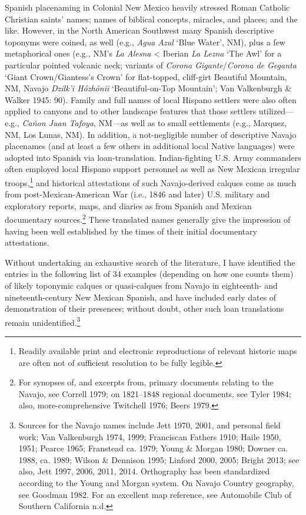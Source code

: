 Spanish placenaming in Colonial New Mexico heavily stressed Roman Catholic Christian saints’ names; names of biblical concepts, miracles, and places; and the like.  However, in the North American Southwest many Spanish descriptive toponyms were coined, as well (e.g., \textit{Agua Azul} ‘Blue Water’, NM), plus a few metaphorical ones (e.g., NM’s \textit{La Alesna} {\textless} Iberian \textit{La Lezna} ‘The Awl’ for a particular pointed volcanic neck; variants of \textit{Corona Gigante}/\textit{Corona de Geganta }‘Giant Crown/Giantess’s Crown’ for flat-topped, cliff-girt Beautiful Mountain, NM, Navajo \textit{Dzilk'i Hózhónii} ‘Beautiful-on-Top Mountain’; Van Valkenburgh \& Walker 1945: 90).  Family and full names of local Hispano settlers were also often applied to canyons and to other landscape features that those settlers utilized—e.g., \textit{Cañon Juan Tafoya}, NM\textit{—}as well as to small settlements (e.g., Marquez, NM, Los Lunas, NM).  In addition, a not-negligible number of descriptive Navajo placenames (and at least a few others in additional local Native languages) were adopted into Spanish via loan-translation.  Indian-fighting U.S. Army commanders often employed local Hispano support personnel as well as New Mexican irregular troops,\footnote{Readily available print and electronic reproductions of relevant historic maps are often not of sufficient resolution to be fully legible.} and historical attestations of such Navajo-derived calques come as much from post-Mexican-American War (i.e., 1846 and later) U.S. military and exploratory reports, maps, and diaries as from Spanish and Mexican documentary sources.\footnote{For synopses of, and excerpts from, primary documents relating to the Navajo, see Correll 1979; on 1821–1848 regional documents, see Tyler 1984; also, more-comprehensive Twitchell 1976; Beers 1979.}  These translated names generally give the impression of having been well established by the times of their initial documentary attestations.

  Without undertaking an exhaustive search of the literature, I have identified the entries in the following list of 34 examples (depending on how one counts them) of likely toponymic calques or quasi-calques from Navajo in eighteenth- and nineteenth-century New Mexican Spanish, and have included early dates of demonstration of their presences; without doubt, other such loan translations remain unidentified.\footnote{Sources for the Navajo names include Jett 1970, 2001, and personal field work; Van Valkenburgh 1974, 1999; Franciscan Fathers 1910; Haile 1950, 1951; Pearce 1965; Franstead ca. 1979; Young \& Morgan 1980; Downer ca. 1988, ca. 1989; Wilson \& Dennison 1995; Linford 2000, 2005; Bright 2013; see also, Jett 1997, 2006, 2011, 2014.  Orthography has been standardized according to the Young and Morgan system.  On Navajo Country geography, see Goodman 1982.  For an excellent map reference, see Automobile Club of Southern California n.d.}

